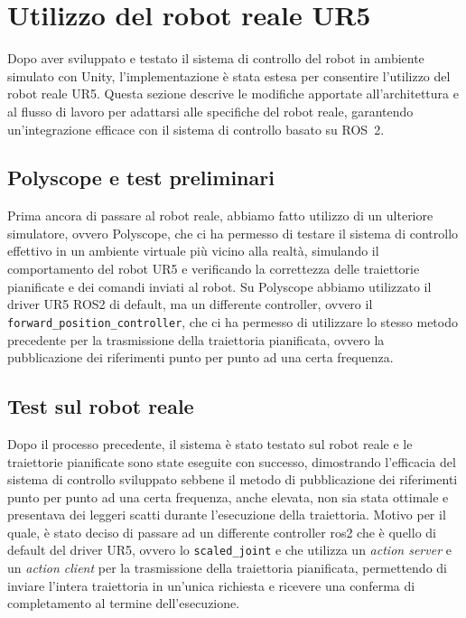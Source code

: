 \chapter{Utilizzo del robot reale UR5}
\label{chap:ur5_reale}

Dopo aver sviluppato e testato il sistema di controllo del robot in ambiente simulato con Unity, l'implementazione è stata estesa per consentire l'utilizzo del robot reale UR5.
Questa sezione descrive le modifiche apportate all'architettura e al flusso di lavoro per adattarsi alle specifiche del robot reale, garantendo un'integrazione efficace con il sistema di controllo basato su ROS~2.

\section{Polyscope e test preliminari}
Prima ancora di passare al robot reale, abbiamo fatto utilizzo di un ulteriore simulatore, ovvero Polyscope, che ci ha permesso di testare il sistema di controllo effettivo in un ambiente virtuale più vicino alla realtà, simulando il comportamento del robot UR5 e verificando la correttezza delle traiettorie pianificate e dei comandi inviati al robot.
Su Polyscope abbiamo utilizzato il driver UR5 ROS2 di default, ma un differente controller, ovvero il \texttt{forward\_position\_controller}, che ci ha permesso di utilizzare lo stesso metodo precedente per la trasmissione della traiettoria pianificata, ovvero la pubblicazione dei riferimenti punto per punto ad una certa frequenza.

\section{Test sul robot reale}
Dopo il processo precedente, il sistema è stato testato sul robot reale e le traiettorie pianificate sono state eseguite con successo, dimostrando l'efficacia del sistema di controllo sviluppato sebbene il metodo di pubblicazione dei riferimenti punto per punto ad una certa frequenza, anche elevata, non sia stata ottimale e presentava dei leggeri scatti durante l'esecuzione della traiettoria.
Motivo per il quale, è stato deciso di passare ad un differente controller ros2 che è quello di default del driver UR5, ovvero lo \texttt{scaled\_joint} e che utilizza un \textit{action server} e un \textit{action client} per la trasmissione della traiettoria pianificata, permettendo di inviare l'intera traiettoria in un'unica richiesta e ricevere una conferma di completamento al termine dell'esecuzione.

